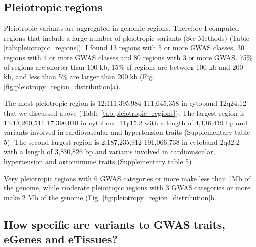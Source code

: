 
%

\subsection*{Pleiotropic regions}

Pleiotropic variants are aggregated in genomic regions.
%
Therefore I computed regions that include a large number of pleiotropic variants (See Methods) (Table \ref{tab:pleiotropic_regions}).
%
I found 13 regions with 5 or more GWAS classes, 30 regions with 4 or more GWAS classes and 80 regions with 3 or more GWAS.
%
75\% of regions are shorter than 100 kb, 15\% of regions are between 100 kb and 200 kb, and less than 5\% are larger than 200 kb (Fig. \ref{fig:pleiotropy_region_distribution}a).

The most pleiotropic region is 12:111,395,984-111,645,358 in cytoband 12q24.12 that we discussed above (Table \ref{tab:pleiotropic_regions}).
%
The largest region is 11:13,260,511-17,396,930 in cytoband 11p15.2 with a length of 4,136,419 bp and variants involved in cardiovascular and hypertension traits (Supplementary table 5).
%
The second largest region is 2:187,235,912-191,066,738 in cytoband 2q32.2 with a length of 3,830,826 bp and variants involved in cardiovascular, hypertension and autoimmune traits  (Supplementary table 5).

Very pleiotropic regions with 6 GWAS categories or more make less than 1Mb of the genome, while moderate pleiotropic regions with 3 GWAS categories or more make 2 Mb of the genome (Fig. \ref{fig:pleiotropy_region_distribution}b.

\subsection*{How specific are variants to GWAS traits, eGenes and eTissues?}

